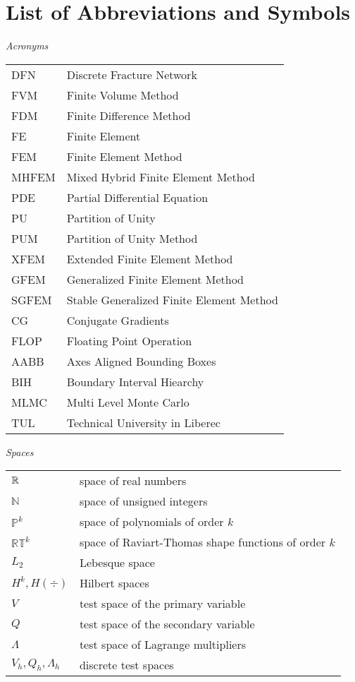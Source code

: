 \section*{List of Abbreviations and Symbols}

\noindent\emph{Acronyms}
\vspace{0.5cm}

\begin{tabularx}{\linewidth}{@{}lX@{}}
DFN & Discrete Fracture Network \\
FVM & Finite Volume Method \\
FDM & Finite Difference Method \\
FE & Finite Element \\
FEM & Finite Element Method \\
MHFEM & Mixed Hybrid Finite Element Method \\
PDE & Partial Differential Equation \\
PU & Partition of Unity \\
PUM & Partition of Unity Method \\
XFEM & Extended Finite Element Method \\
GFEM & Generalized Finite Element Method \\
SGFEM & Stable Generalized Finite Element Method \\
CG & Conjugate Gradients \\
FLOP & Floating Point Operation \\
AABB & Axes Aligned Bounding Boxes \\
BIH & Boundary Interval Hiearchy \\
MLMC & Multi Level Monte Carlo\\
TUL & Technical University in Liberec
\end{tabularx}
\vspace{1cm}

\noindent\emph{Spaces}
\vspace{0.5cm}

\begin{tabularx}{\linewidth}{@{}lX@{}}
$\mathbb{R}$ & space of real numbers  \\
$\mathbb N$ & space of unsigned integers \\
$\mathbb P^k$ & space of polynomials of order $k$  \\
$\mathbb {RT}^k$ & space of Raviart-Thomas shape functions of order $k$  \\
$L_2$ & Lebesque space \\
$H^k, H(\div)$ & Hilbert spaces \\
$V$ & test space of the primary variable \\
$Q$ & test space of the secondary variable \\
$\Lambda$ & test space of Lagrange multipliers\\
$V_h, Q_h, \Lambda_h$ & discrete test spaces\\
\end{tabularx}
\pagebreak

